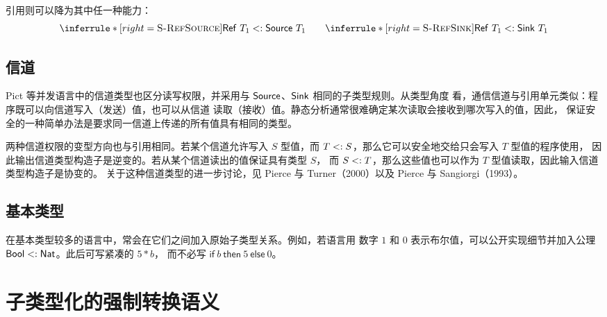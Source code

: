 
引用则可以降为其中任一种能力：
\[
\inferrule*[right=\textsc{S-RefSource}]
 { }{\tapltype{Ref}\ T_1\subtype\tapltype{Source}\ T_1}
\qquad
\inferrule*[right=\textsc{S-RefSink}]
 { }{\tapltype{Ref}\ T_1\subtype\tapltype{Sink}\ T_1}
\]

\subsection*{信道}

Pict 等并发语言中的信道类型也区分读写权限，并采用与
\(\mathsf{Source}\)、\(\mathsf{Sink}\) 相同的子类型规则。从类型角度
看，通信信道与引用单元类似：程序既可以向信道写入（发送）值，也可以从信道
读取（接收）值。静态分析通常很难确定某次读取会接收到哪次写入的值，因此，
保证安全的一种简单办法是要求同一信道上传递的所有值具有相同的类型。

两种信道权限的变型方向也与引用相同。若某个信道允许写入 \(S\) 型值，而
\(T\mathrel{<:} S\)，那么它可以安全地交给只会写入 \(T\) 型值的程序使用，
因此输出信道类型构造子是逆变的。若从某个信道读出的值保证具有类型 \(S\)，
而 \(S\mathrel{<:} T\)，那么这些值也可以作为 \(T\) 型值读取，因此输入信道
类型构造子是协变的。
关于这种信道类型的进一步讨论，见 Pierce 与 Turner（2000）以及 Pierce 与
Sangiorgi（1993）。

\subsection*{基本类型}

在基本类型较多的语言中，常会在它们之间加入原始子类型关系。例如，若语言用
数字 \(1\) 和 \(0\) 表示布尔值，可以公开实现细节并加入公理
\(\mathsf{Bool}\mathrel{<:}\mathsf{Nat}\)。此后可写紧凑的 \(5*b\)，
而不必写 \(\mathsf{if}\ b\ \mathsf{then}\ 5\ \mathsf{else}\ 0\)。

\section{子类型化的强制转换语义}
\label{sec:15.6}

